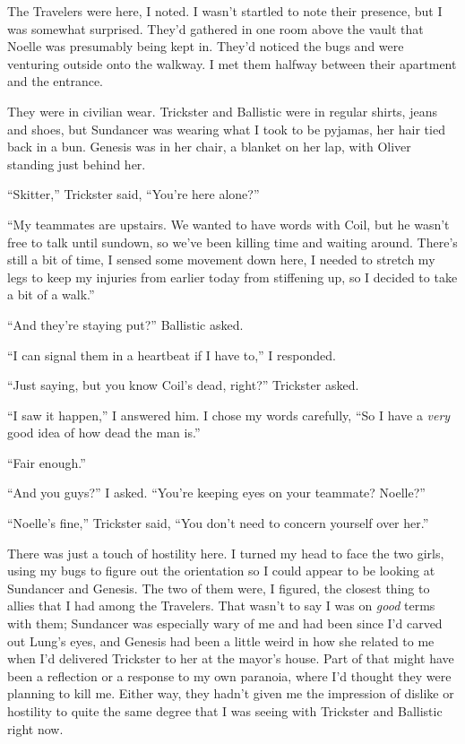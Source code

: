 The Travelers were here, I noted.  I wasn't startled to note their presence, but I was somewhat surprised.  They'd gathered in one room above the vault that Noelle was presumably being kept in.  They'd noticed the bugs and were venturing outside onto the walkway.  I met them halfway between their apartment and the entrance.



They were in civilian wear.  Trickster and Ballistic were in regular shirts, jeans and shoes, but Sundancer was wearing what I took to be pyjamas, her hair tied back in a bun.  Genesis was in her chair, a blanket on her lap, with Oliver standing just behind her.



``Skitter,'' Trickster said, ``You're here alone?''



``My teammates are upstairs.  We wanted to have words with Coil, but he wasn't free to talk until sundown, so we've been killing time and waiting around.  There's still a bit of time, I sensed some movement down here, I needed to stretch my legs to keep my injuries from earlier today from stiffening up, so I decided to take a bit of a walk.''



``And they're staying put?''  Ballistic asked.



``I can signal them in a heartbeat if I have to,'' I responded.



``Just saying, but you know Coil's dead, right?'' Trickster asked.



``I saw it happen,'' I answered him.  I chose my words carefully, ``So I have a \emph{very} good idea of how dead the man is.''



``Fair enough.''



``And you guys?'' I asked.  ``You're keeping eyes on your teammate?  Noelle?''



``Noelle's fine,'' Trickster said, ``You don't need to concern yourself over her.''



There was just a touch of hostility here.  I turned my head to face the two girls, using my bugs to figure out the orientation so I could appear to be looking at Sundancer and Genesis.  The two of them were, I figured, the closest thing to allies that I had among the Travelers.  That wasn't to say I was on \emph{good} terms with them; Sundancer was especially wary of me and had been since I'd carved out Lung's eyes, and Genesis had been a little weird in how she related to me when I'd delivered Trickster to her at the mayor's house.  Part of that might have been a reflection or a response to my own paranoia, where I'd thought they were planning to kill me.  Either way, they hadn't given me the impression of dislike or hostility to quite the same degree that I was seeing with Trickster and Ballistic right now.



